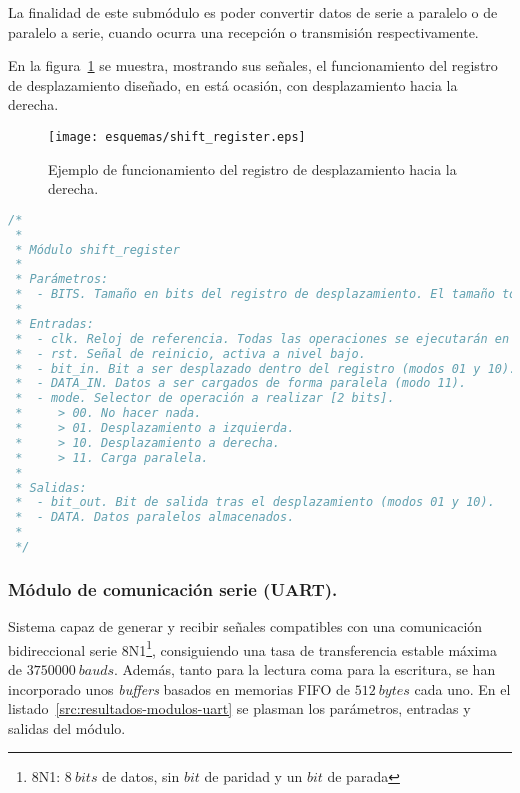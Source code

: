 La finalidad de este submódulo es poder convertir datos de serie a paralelo o de paralelo a serie, cuando ocurra una recepción o transmisión respectivamente.

En la figura~\ref{fig:shift_esquema} se muestra, mostrando sus señales, el funcionamiento del registro de desplazamiento diseñado, en está ocasión, con desplazamiento hacia la derecha.

\begin{figure}[htb]
    \centering
    \texttt{[image: esquemas/shift\_register.eps]}
    \caption{Ejemplo de funcionamiento del registro de desplazamiento hacia la derecha.}
    \label{fig:shift_esquema}
\end{figure}

\begin{lstlisting}[language=Verilog,
    caption={Parámetros, entradas y salidas del módulo shift\_register.},
    label=src:resultados-modulos-shift]
/*
 *
 * Módulo shift_register
 *
 * Parámetros:
 *  - BITS. Tamaño en bits del registro de desplazamiento. El tamaño total será de BITS + 1 (bit de salida).
 *
 * Entradas:
 *  - clk. Reloj de referencia. Todas las operaciones se ejecutarán en el flanqueo de subida.
 *  - rst. Señal de reinicio, activa a nivel bajo.
 *  - bit_in. Bit a ser desplazado dentro del registro (modos 01 y 10).
 *  - DATA_IN. Datos a ser cargados de forma paralela (modo 11).
 *  - mode. Selector de operación a realizar [2 bits].
 *     > 00. No hacer nada.
 *     > 01. Desplazamiento a izquierda.
 *     > 10. Desplazamiento a derecha.
 *     > 11. Carga paralela.
 *
 * Salidas:
 *  - bit_out. Bit de salida tras el desplazamiento (modos 01 y 10).
 *  - DATA. Datos paralelos almacenados.
 *
 */
\end{lstlisting}


\subsubsection{Módulo de comunicación serie (UART).}
Sistema capaz de generar y recibir señales compatibles con una comunicación bidireccional serie 8N1\footnote{8N1: $8~bits$ de datos, sin $bit$ de paridad y un $bit$ de parada}, consiguiendo una tasa de transferencia estable máxima de $3750000~bauds$. Además, tanto para la lectura coma para la escritura, se han incorporado unos \emph{buffers} basados en memorias FIFO de $512~bytes$ cada uno. En el listado~\ref{src:resultados-modulos-uart} se plasman los parámetros, entradas y salidas del módulo.

